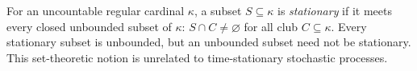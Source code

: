 
For an uncountable regular cardinal $\kappa$, a subset $S\subseteq\kappa$ is \emph{stationary} if it meets every closed unbounded subset of $\kappa$: $S\cap C\ne\varnothing$ for all club $C\subseteq\kappa$. Every stationary subset is unbounded, but an unbounded subset need not be stationary. This set-theoretic notion is unrelated to time-stationary stochastic processes.
